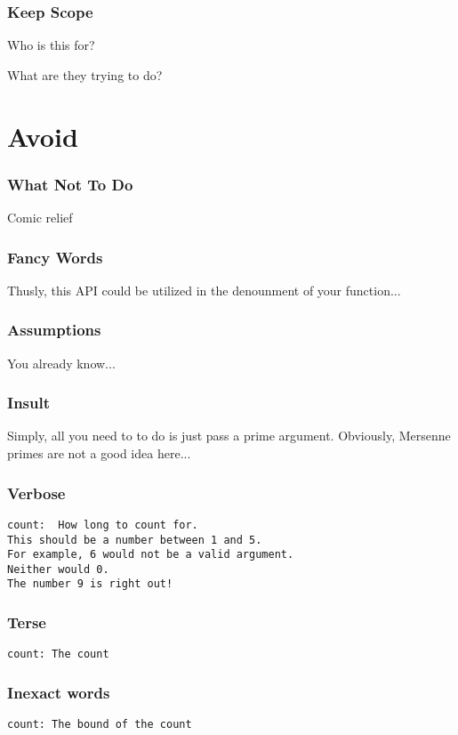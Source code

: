 \begin{frame}
\frametitle{Keep Scope}

Who is this for?

What are they trying to do?
\end{frame}

\section{Avoid}

\begin{frame}
\frametitle{What Not To Do}

Comic relief
\end{frame}

\begin{frame}
\frametitle{Fancy Words}

Thusly, this API could be utilized in the denounment of your function...
\end{frame}

\begin{frame}
\frametitle{Assumptions}

You already know...
\end{frame}

\begin{frame}
\frametitle{Insult}

Simply, all you need to to do is just pass a prime argument.
Obviously, Mersenne primes are not a good idea here...
\end{frame}

\begin{frame}[fragile]
\frametitle{Verbose}

\begin{lstlisting}
count:  How long to count for.
This should be a number between 1 and 5.
For example, 6 would not be a valid argument.
Neither would 0.
The number 9 is right out!
\end{lstlisting}
\end{frame}

\begin{frame}[fragile]
\frametitle{Terse}

\begin{lstlisting}
count: The count
\end{lstlisting}
\end{frame}

\begin{frame}[fragile]
\frametitle{Inexact words}

\begin{lstlisting}
count: The bound of the count
\end{lstlisting}

\end{frame}

